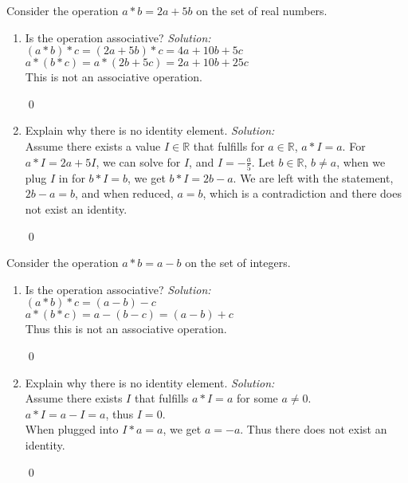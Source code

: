 \documentclass[12 pt]{article}
\newenvironment{problem}[2][Problem]{\begin{trivlist}
\item[\hskip \labelsep {\bfseries #1}\hskip \labelsep {\bfseries #2.}]}{\end{trivlist}}
\newenvironment{sol}
    {\emph{Solution:}
    }
    {
    \qed
    }
\theoremstyle{definition}
\newcommand{\R}{\mathbb{R}} %
\begin{document}
\begin{problem}{1}
Consider the operation $a*b = 2a + 5b$ on the set of real numbers.
\begin{enumerate}[label=\alph*)]
    \item  Is the operation associative? \begin{sol}\\
    $(a*b)*c = (2a+5b) * c = 4a + 10b +5c$\\
    $a*(b*c) = a*(2b+5c) = 2a + 10b + 25c$\\
    This is not an associative operation.
    \end{sol}
    \item  Explain why there is no identity element. \begin{sol}\\
    Assume there exists a value $I\in \R$ that fulfills for $a\in \R$, $a*I=a$. For $a*I=2a+5I$, we can solve for $I$, and $I=-\frac{a}{5}$. Let $b \in \R$, $b \neq a$, when we plug $I$ in for $b*I=b$, we get $b*I=2b-a$. We are left with the statement, $2b-a=b$, and when reduced, $a=b$, which is a contradiction and there does not exist an identity. 
    \end{sol}
\end{enumerate}
\end{problem}
\begin{problem}{2}
Consider the operation $a*b = a-b$ on the set of integers.
\begin{enumerate}[label=\alph*)]
    \item  Is the operation associative? \begin{sol}\\
    $(a*b)*c=(a-b)-c$\\
    $a*(b*c)=a-(b-c)=(a - b) + c$\\
    Thus this is not an associative operation.
    \end{sol}
    \item  Explain why there is no identity element. \begin{sol}\\
    Assume there exists $I$ that fulfills $a*I=a$ for some $a\neq 0$.\\
    $a*I = a - I = a$, thus $I = 0$.\\
    When plugged into $I*a=a$, we get $a=-a$. Thus there does not exist an identity.
    \end{sol}
\end{enumerate}
\end{problem}
\end{document}
